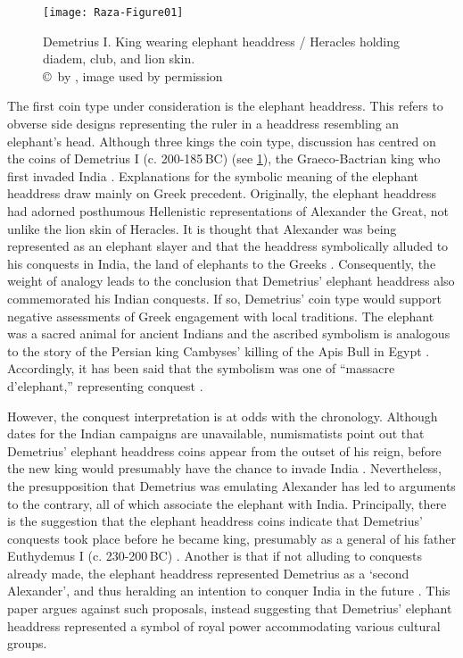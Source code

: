 \documentclass{ijsra}
\renewcommand\BC{{\,BC\xspace}}
\begin{document}
\begin{figure}[!htb] %
	\centering
	\texttt{[image: Raza-Figure01]}
	\caption{Demetrius I. King wearing elephant headdress / Heracles holding diadem, club, and lion skin.
		{\normalfont\scriptsize \\ \copyright\ by \cite{Coin}, image used by permission}}
	\label{fig:Raza-Figure01}
\end{figure}

The first coin type under consideration is the elephant headdress.
This refers to obverse side designs representing the ruler in a headdress resembling an elephant's head.
Although three kings the coin type, discussion has centred on the coins of Demetrius I
(c. 200-185\BC) (see \cref{fig:Raza-Figure01}), the Graeco-Bactrian king who first invaded India \parencites[47--48]{Bopearachchi2011}[17--18]{Kalita1997}.
Explanations for the symbolic meaning of the elephant headdress draw mainly on Greek precedent. Originally, the elephant headdress had adorned posthumous Hellenistic representations of Alexander the Great, not unlike the lion skin of Heracles. It is thought that Alexander was being represented as an elephant slayer and that the headdress symbolically alluded to his conquests in India, the land of elephants to the Greeks \parencites[50]{Curtis2007}[335]{Green1993}[104--105]{MacDowall2007a}.
Consequently, the weight of analogy leads to the conclusion that Demetrius’ elephant headdress also commemorated his Indian conquests. If so, Demetrius’ coin type would support negative assessments of Greek engagement with local traditions. The elephant was a sacred animal for ancient Indians and the ascribed symbolism is analogous to the story of the Persian king Cambyses’ killing of the Apis Bull in Egypt \parencite[11--19]{Gupta1983}. Accordingly, it has been said that the symbolism was one of “massacre d’elephant,” representing conquest \parencite[492]{Widemann2009}.

However, the conquest interpretation is at odds with the chronology. Although dates for the Indian campaigns are unavailable, numismatists point out that Demetrius’ elephant headdress coins appear from the outset of his reign, before the new king would presumably have the chance to invade India \parencite[157]{Holt2012}.
Nevertheless, the presupposition that Demetrius was emulating Alexander has led to arguments to the contrary, all of which associate the elephant with India.
Principally, there is the suggestion that the elephant headdress coins indicate that Demetrius’ conquests took place before he became king, presumably as a general of his father Euthydemus I (c. 230-200\BC) \parencite[157]{Holt2012}.
Another is that if not alluding to conquests already made, the elephant headdress represented Demetrius as a ‘second Alexander’, and thus heralding an intention to conquer India in the future \parencites[190]{Sidky2000}[132]{Tarn1951}.
This paper argues against such proposals, instead suggesting that Demetrius’ elephant headdress represented a symbol of royal power accommodating various cultural groups.
\end{document}
